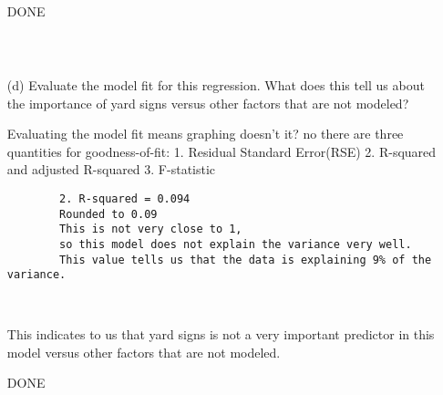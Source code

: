 \documentclass[12pt,letterpaper]{article}
\begin{document}
\begin{enumerate}
		DONE
		\begin{verbatim}
		
		
		\end{verbatim}
		\item [(d)] Evaluate the model fit for this regression.  What does this	tell us about the importance of yard signs versus other factors that are not modeled?
		
		Evaluating the model fit means graphing doesn't it?
		no there are three quantities for goodness-of-fit:
		1. Residual Standard Error(RSE)
		2. R-squared and adjusted R-squared
		3. F-statistic 
		
			\begin{verbatim}
		2. R-squared = 0.094 
		Rounded to 0.09
		This is not very close to 1, 
		so this model does not explain the variance very well. 
		This value tells us that the data is explaining 9% of the variance.
		
		
		\end{verbatim}
	This indicates to us that yard signs is not a very important predictor in this model versus other factors that are not modeled. 
	
	DONE
	\end{enumerate}  
	
	
\end{document}
